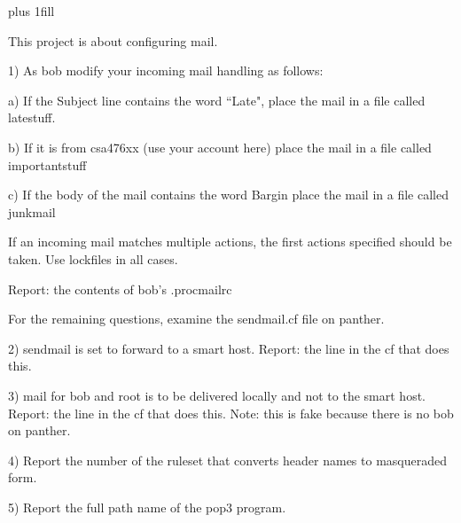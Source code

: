 
\rightskip=0pt plus 1fill

\parindent 0pt

This project is about configuring mail.

1) As {\ltt{}bob} modify your incoming mail handling as follows:

a) If the Subject line contains the word ``Late",
place the mail in a file called {\ltt{}latestuff}.

b) If it is from {\ltt{}csa476xx} (use your account here)
place the mail in a file called {\ltt{}importantstuff}

c) If the body of the mail contains the word {\ltt{}Bargin}
place the mail in a file called {\ltt{}junkmail}

If an incoming mail matches multiple actions, the first actions
specified should be taken.
Use lockfiles in all cases.

Report: the contents of bob's {\ltt{}.procmailrc}

For the remaining questions, examine the {\ltt{}sendmail.cf}
file on {\ltt{}panther}.

2) sendmail is set to forward to a smart host.
Report: the line in the {\ltt{}cf} that does this.

3) mail for {\ltt{}bob} and {\ltt{}root} is to be delivered locally and
not to the smart host.
Report: the line in the {\ltt{}cf} that does this.
Note: this is fake because there is no {\ltt{}bob} on {\ltt{}panther}.

4) Report the number of the ruleset that converts header
names to masqueraded form.

5) Report the full path name of the {\ltt{}pop3} program.
\bye
